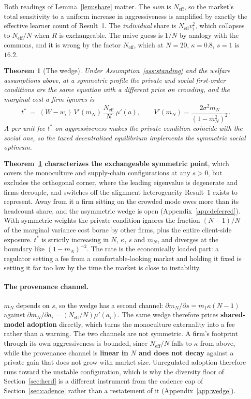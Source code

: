 \documentclass{article}
\theoremstyle{plain}
\newtheorem{theorem}{Theorem}
\theoremstyle{definition}
\newcommand{\Neff}{N_{\mathrm{eff}}}
\newcommand{\mN}{m_N}
\begin{document}
Both readings of Lemma~\ref{lem:share} matter. The \emph{sum} is $\Neff$, so the market's total sensitivity to a uniform increase in aggressiveness is amplified by exactly the effective learner count of Result~1. The \emph{individual} share is $\Neff v_i^2$, which collapses to $\Neff/N$ when $R$ is exchangeable. The naive guess is $1/N$ by analogy with the commons, and it is wrong by the factor $\Neff$, which at $N=20$, $\kappa=0.8$, $s=1$ is $16.2$.

\begin{theorem}[The wedge]
\label{thm:wedge}
Under Assumption~\ref{ass:standing} and the welfare assumptions above, at a symmetric profile the private and social first-order conditions are the same equation with a different price on crowding, and the marginal cost a firm ignores is
\begin{equation}
t^{*} \;=\; (W - w_i)\, V'(\mN)\, \frac{\Neff}{N}\, \mu'(a), \qquad V'(\mN) = \frac{2\sigma^2 \mN}{(1-\mN^2)^2}.
\end{equation}
A per-unit fee $t^{*}$ on aggressiveness makes the private condition coincide with the social one, so the taxed decentralized equilibrium implements the symmetric social optimum.
\end{theorem}

\textbf{Theorem~\ref{thm:wedge} characterizes the exchangeable symmetric point}, which covers the monoculture and supply-chain configurations at any $s>0$, but excludes the orthogonal corner, where the leading eigenvalue is degenerate and firms decouple, and switches off the alignment heterogeneity Result~1 exists to represent. Away from it a firm sitting on the crowded mode owes more than its headcount share, and the asymmetric wedge is open (Appendix~\ref{app:deferred}). With symmetric weights the private condition ignores the fraction $(N-1)/N$ of the marginal variance cost borne by other firms, plus the entire client-side exposure. $t^{*}$ is strictly increasing in $N$, $\kappa$, $s$ and $\mN$, and diverges at the boundary like $(1-\mN)^{-2}$. The rate is the economically loaded part: a regulator setting a fee from a comfortable-looking market and holding it fixed is setting it far too low by the time the market is close to instability.

\paragraph{The provenance channel.}
$\mN$ depends on $s$, so the wedge has a second channel: $\partial \mN/\partial s = m_1\kappa(N-1)$ against $\partial\mN/\partial a_i = (\Neff/N)\mu'(a_i)$. The same wedge therefore prices \textbf{shared-model adoption} directly, which turns the monoculture externality into a fee rather than a warning. The two channels are not symmetric. A firm's footprint through its own aggressiveness is bounded, since $\Neff/N$ falls to $\kappa$ from above, while the provenance channel is \textbf{linear in $N$ and does not decay} against a private gain that does not grow with market size. Unregulated adoption therefore runs toward the unstable configuration, which is why the diversity floor of Section~\ref{sec:herd} is a different instrument from the cadence cap of Section~\ref{sec:cadence} rather than a restatement of it (Appendix~\ref{app:wedge}).
\end{document}
